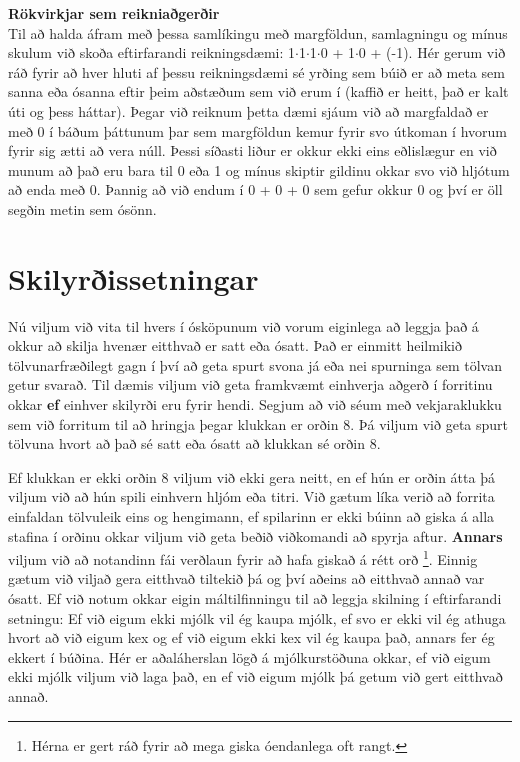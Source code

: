\vspace{5pt}
\begin{itarefni}
\textbf{Rökvirkjar sem reikniaðgerðir}\\
Til að halda áfram með þessa samlíkingu með margföldun, samlagningu og mínus skulum við skoða eftirfarandi reikningsdæmi:
1$\cdot$1$\cdot$1$\cdot$0 + 1$\cdot$0 + (-1).
Hér gerum við ráð fyrir að hver hluti af þessu reikningsdæmi sé yrðing sem búið er að meta sem sanna eða ósanna eftir þeim aðstæðum sem við erum í (kaffið er heitt, það er kalt úti og þess háttar).
Þegar við reiknum þetta dæmi sjáum við að margfaldað er með 0 í báðum þáttunum þar sem margföldun kemur fyrir svo útkoman í hvorum fyrir sig ætti að vera núll.
Þessi síðasti liður er okkur ekki eins eðlislægur en við munum að það eru bara til 0 eða 1 og mínus skiptir gildinu okkar svo við hljótum að enda með 0.
Þannig að við endum í 0 + 0 + 0 sem gefur okkur 0 og því er öll segðin metin sem ósönn.
\end{itarefni}


\section{Skilyrðissetningar}
Nú viljum við vita til hvers í ósköpunum við vorum eiginlega að leggja það á okkur að skilja hvenær eitthvað er satt eða ósatt.
Það er einmitt heilmikið tölvunarfræðilegt gagn í því að geta spurt svona já eða nei spurninga sem tölvan getur svarað.
Til dæmis viljum við geta framkvæmt einhverja aðgerð í forritinu okkar \textbf{ef} einhver skilyrði eru fyrir hendi.
Segjum að við séum með vekjaraklukku sem við forritum til að hringja þegar klukkan er orðin 8.
Þá viljum við geta spurt tölvuna hvort að það sé satt eða ósatt að klukkan sé orðin 8.

Ef klukkan er ekki orðin 8 viljum við ekki gera neitt, en ef hún er orðin átta þá viljum við að hún spili einhvern hljóm eða titri.
Við gætum líka verið að forrita einfaldan tölvuleik eins og hengimann, ef spilarinn er ekki búinn að giska á alla stafina í orðinu okkar viljum við geta beðið viðkomandi að spyrja aftur.
\textbf{Annars} viljum við að notandinn fái verðlaun fyrir að hafa giskað á rétt orð \footnote{Hérna er gert ráð fyrir að mega giska óendanlega oft rangt.}.
Einnig gætum við viljað gera eitthvað tiltekið þá og því aðeins að eitthvað annað var ósatt.
Ef við notum okkar eigin máltilfinningu til að leggja skilning í eftirfarandi setningu: Ef við eigum ekki mjólk vil ég kaupa mjólk, ef svo er ekki vil ég athuga hvort að við eigum kex og ef við eigum ekki kex vil ég kaupa það, annars fer ég ekkert í búðina.
Hér er aðaláherslan lögð á mjólkurstöðuna okkar, ef við eigum ekki mjólk viljum við laga það, en ef við eigum mjólk þá getum við gert eitthvað annað.

